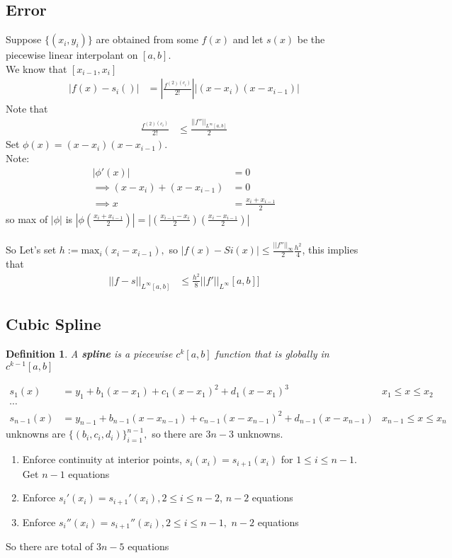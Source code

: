 \documentclass[11pt,oneside]{book}
\theoremstyle{break}
\theoremstyle{break}
\newtheorem{defn}{Definition}[corL]
\newcommand{\note}{\color{red}Note: \color{black}}
\begin{document}
\subsection[Error]{Error}
Suppose $\{(x_i,y_i)\}$ are obtained from some $f(x)$ and let $s(x)$ be the piecewise linear interpolant on $[a,b]$. \\
We know that $[x_{i-1},x_i]$ \begin{align*}
\left| f(x)-s_i() \right|&=\left| \frac{f^{(2)(c_i)}}{2!} \right||(x-x_i)(x-x_{i-1})|
\end{align*}
Note that \begin{align*}
 \frac{f^{(2)(c_i)}}{2!}&\leq \frac{||f''||_{L^{\infty}[a,b]}}{2}
\end{align*}
Set $\phi(x)=(x-x_i)(x-x_{i-1})$.\\
\note \begin{align*}
|\phi'(x)|&=0\\
\implies (x-x_i)+(x-x_{i-1})&=0\\
\implies x&=\frac{x_i+x_{i-1}}{2}
\end{align*}
so max of $|\phi|$ is $\left| \phi\left(\frac{x_i+x_{i-1}}{2} \right)\right|=\left|\left( \frac{x_{i-1}-x_{i}}{2}\right)\left(\frac{x_i-x_{i-1}}{2} \right) \right|$\\
\hfill\\
So Let's set $h:=\text{max}_i(x_i-x_{i-1}),$ so $|f(x)-Si(x)|\leq \frac{||f''||_{\infty}}{2}\frac{h^2}{4}$, this implies that \begin{align*}
||f-s||_{L^{\infty}[a,b]}&\leq \frac{h^2}{8}||f'||_{L^{\infty}}[a,b]]
\end{align*}
\subsection[Cubic Spline]{Cubic Spline}
\begin{defn}
A \textbf{spline} is a piecewise $c^k[a,b]$ function that is globally in $c^{k-1}[a,b]$
\end{defn} 
\begin{align*}
s_1(x)&=y_1+b_1(x-x_1)+c_1(x-x_1)^2+d_1(x-x_1)^3 &x_1\leq x\leq x_2\\
\cdots\\
s_{n-1}(x)&=y_{n-1}+b_{n-1}(x-x_{n-1})+c_{n-1}(x-x_{n-1})^2+d_{n-1}(x-x_{n-1})&x_{n-1}\leq x\leq x_n
\end{align*}
unknowns are $\{(b_i,c_i,d_i)\}_{i=1}^{n-1},$ so there are $3n-3$ unknowns. \begin{enumerate}
\item Enforce continuity at interior points, $s_i(x_i)=s_{i+1}(x_i)$ for $1\leq i\leq n-1.$ Get $n-1$ equations
\item Enforce $s_i'(x_i)=s_{i+1}'(x_i),2\leq i\leq n-2$, $n-2$ equations
\item Enforce $s_i''(x_i)=s_{i+1}''(x_i),2\leq i \leq n-1,$ $n-2$ equations
\end{enumerate}
So there are total of $3n-5$ equations
\end{document}
